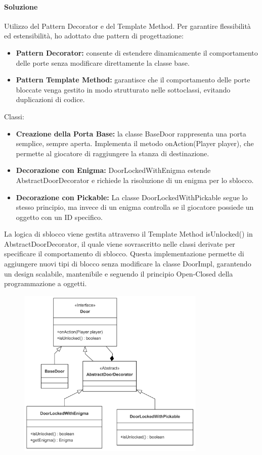 \documentclass[a4paper,12pt]{report}
\begin{document}
\paragraph{Soluzione} %
Utilizzo del Pattern Decorator e del Template Method.
Per garantire flessibilità ed estensibilità, ho adottato due pattern di progettazione:
\begin{itemize}
	\item \textbf{Pattern Decorator:} consente di estendere dinamicamente il comportamento delle porte senza modificare direttamente la classe base.
	\item \textbf{Pattern Template Method:} garantisce che il comportamento delle porte bloccate venga gestito in modo strutturato nelle sottoclassi, evitando duplicazioni di codice.
\end{itemize}
Classi:
\begin{itemize}
	\item \textbf{Creazione della Porta Base:} la classe BaseDoor rappresenta una porta semplice, sempre aperta. Implementa il metodo onAction(Player player), che permette al giocatore di raggiungere la stanza di destinazione.
	\item \textbf{Decorazione con Enigma:} DoorLockedWithEnigma estende AbstractDoorDecorator e richiede la risoluzione di un enigma per lo sblocco.
	\item \textbf{Decorazione con Pickable:} La classe DoorLockedWithPickable segue lo stesso principio, ma invece di un enigma controlla se il giocatore possiede un oggetto con un ID specifico.
\end{itemize}
La logica di sblocco viene gestita attraverso il Template Method isUnlocked() in AbstractDoorDecorator, il quale viene sovrascritto nelle classi derivate per specificare il comportamento di sblocco. 
Questa implementazione permette di aggiungere nuovi tipi di blocco senza modificare la classe DoorImpl, garantendo un design scalabile, mantenibile e seguendo il principio Open-Closed della programmazione a oggetti.
\begin{figure} 
    \centering
    \includegraphics[width=0.8\textwidth]{img/doors.png}
    \label{img:doors}
\end{figure}
\end{document}
